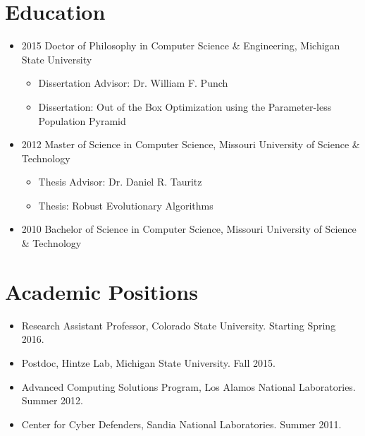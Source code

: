 \documentclass[a4paper,11pt]{article}
\begin{document}
\maketitle
 
\section{Education}
\begin{itemize}
\item 2015 Doctor of Philosophy in Computer Science \& Engineering, Michigan State University
\begin{itemize}
  \item Dissertation Advisor:  Dr. William F. Punch%
  \item Dissertation: Out of the Box Optimization using the Parameter-less Population Pyramid
\end{itemize}
\item 2012 Master of Science in Computer Science, Missouri University of Science \& Technology
\begin{itemize}
  \item Thesis Advisor:  Dr. Daniel R. Tauritz%
  \item Thesis: Robust Evolutionary Algorithms
\end{itemize}
\item 2010 Bachelor of Science in Computer Science, Missouri University of Science \& Technology
\end{itemize}
\section{Academic Positions}
\begin{itemize}
\item Research Assistant Professor, Colorado State University. Starting Spring 2016.
\item Postdoc, Hintze Lab, Michigan State University. Fall 2015.
\item Advanced Computing Solutions Program, Los Alamos National Laboratories. Summer 2012.
\item Center for Cyber Defenders, Sandia National Laboratories. Summer 2011.
\end{itemize}
\end{document}

